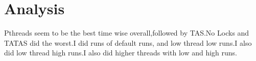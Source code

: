 \documentclass[12pt,letterpaper,notitlepage]{article}
\begin{document}
\section{Analysis}
Pthreads seem to be the best time wise overall,followed by TAS.No Locks and TATAS did the worst.I did runs of default runs, and  low thread low runs.I also did low thread high runs.I also did higher threads with low and high runs.
\end{document}
